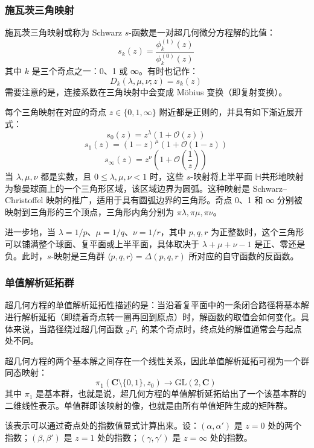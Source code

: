 \subsubsection{施瓦茨三角映射}
施瓦茨三角映射或称为 Schwarz $s$-函数是一对超几何微分方程解的比值：
$$
s_k(z) = \frac{\phi_k^{(1)}(z)}{\phi_k^{(0)}(z)}~
$$
其中 $k$ 是三个奇点之一：0、1 或 ∞。有时也记作：
$$
D_k(\lambda, \mu, \nu; z) = s_k(z)~
$$
需要注意的是，连接系数在三角映射中会变成 Möbius 变换（即复射变换）。

每个三角映射在对应的奇点 $z \in \{0, 1, \infty\}$ 附近都是正则的，并具有如下渐近展开式：
$$
s_0(z) = z^\lambda \left(1 + \mathcal{O}(z)\right)~
$$
$$
s_1(z) = (1 - z)^\mu \left(1 + \mathcal{O}(1 - z)\right)~
$$
$$
s_\infty(z) = z^\nu \left(1 + \mathcal{O}\left(\frac{1}{z}\right)\right)~
$$
当 $\lambda, \mu, \nu$ 都是实数，且 $0 \leq \lambda, \mu, \nu < 1$ 时，这些 $s$-映射将上半平面 $\mathbb{H}$共形地映射为黎曼球面上的一个三角形区域，该区域边界为圆弧。这种映射是 Schwarz–Christoffel 映射的推广，适用于具有圆弧边界的三角形。奇点 0、1 和 ∞ 分别被映射到三角形的三个顶点，三角形内角分别为 $\pi\lambda, \pi\mu, \pi\nu$。

进一步地，当 $\lambda = 1/p$、$\mu = 1/q$、$\nu = 1/r$，其中 $p, q, r$ 为正整数时，这个三角形可以铺满整个球面、复平面或上半平面，具体取决于 $\lambda + \mu + \nu - 1$ 是正、零还是负。此时，$s$-映射是三角群 $\langle p, q, r \rangle = \Delta(p, q, r)$ 所对应的自守函数的反函数。
\subsubsection{单值解析延拓群}
超几何方程的单值解析延拓性描述的是：当沿着复平面中的一条闭合路径将基本解进行解析延拓（即绕着奇点转一圈再回到原点）时，解函数的取值会如何变化。具体来说，当路径绕过超几何函数 ${}_2F_1$ 的某个奇点时，终点处的解值通常会与起点处不同。

超几何方程的两个基本解之间存在一个线性关系，因此单值解析延拓可视为一个群同态映射：
$$
\pi_1(\mathbf{C} \setminus \{0, 1\}, z_0) \to \mathrm{GL}(2, \mathbf{C})~
$$
其中 $\pi_1$ 是基本群，也就是说，超几何方程的单值解析延拓给出了一个该基本群的二维线性表示。单值群即该映射的像，也就是由所有单值矩阵生成的矩阵群。

该表示可以通过奇点处的指数值显式计算出来。设：$(\alpha, \alpha')$ 是 $z = 0$ 处的两个指数；$(\beta, \beta')$ 是 $z = 1$ 处的指数；$(\gamma, \gamma')$ 是 $z = \infty$ 处的指数。

